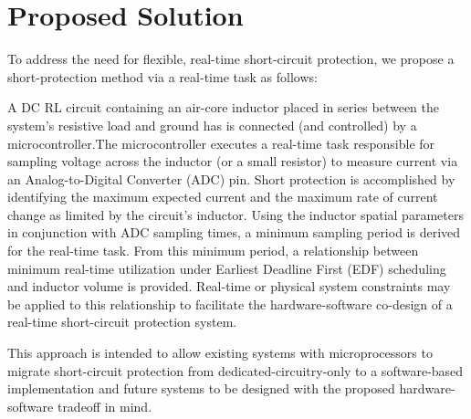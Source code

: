 \documentclass[11pt,oneside]{report}
\begin{document}
    \section*{Proposed Solution}
    To address the need for flexible, real-time short-circuit protection, we propose a short-protection method via a real-time task as follows:
    
    A DC RL circuit containing an air-core inductor placed in series between the system's resistive load and ground has is connected (and controlled) by a microcontroller.The microcontroller executes a real-time task responsible for sampling voltage across the inductor (or a small resistor) to measure current via an Analog-to-Digital Converter (ADC) pin. Short protection is accomplished by identifying the maximum expected current and the maximum rate of current change as limited by the circuit's inductor. Using the inductor spatial parameters in conjunction with ADC sampling times, a minimum sampling period is derived for the real-time task. From this minimum period, a relationship between minimum real-time utilization under Earliest Deadline First (EDF) scheduling and inductor volume  is provided. Real-time or physical system constraints may be applied to this relationship to facilitate the hardware-software co-design of a real-time short-circuit protection system.
    
    This approach is intended to allow existing systems with microprocessors to migrate short-circuit protection from dedicated-circuitry-only to a software-based implementation and future systems to be designed with the proposed hardware-software tradeoff in mind.
    
\end{document}
